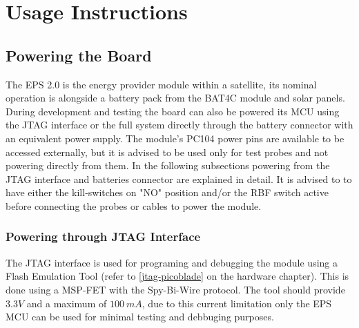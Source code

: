 %
%
%
%
%

%
%
%
%
%
%

\chapter{Usage Instructions} \label{ch:instructions}

\section{Powering the Board}

The EPS 2.0 is the energy provider module within a satellite, its nominal operation is alongside a battery pack from the BAT4C module and solar panels. 
During development and testing the board can also be powered its MCU using the JTAG interface or the full system directly through the battery connector with an equivalent power supply. The module's PC104 power pins are available to be accessed externally, but it is advised to be used only for test probes and not powering directly from them. 
In the following subsections powering from the JTAG interface and batteries connector are explained in detail. 
It is advised to to have either the kill-switches on "NO" position and/or the RBF switch active before connecting the probes or cables to power the module.

 
\subsection{Powering through JTAG Interface}

The JTAG interface is used for programing and debugging the module using a Flash Emulation Tool (refer to \autoref{jtag-picoblade} on the hardware chapter). 
This is done using a MSP-FET with the Spy-Bi-Wire protocol.
The tool should provide $3.3 V$ and a maximum of $100\ mA$, due to this current limitation only the EPS MCU can be used for minimal testing and debbuging purposes.

